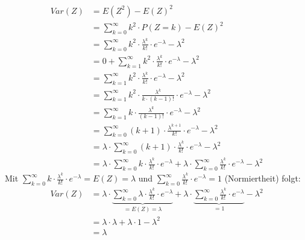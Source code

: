 \begin{equation*}
	\begin{split}
			Var(Z) 	&= E(Z^2) - E(Z)^2 \\
					&= \sum_{k=0}^{\infty} k^2 \cdot P(Z = k) - E(Z)^2\\
					&= \sum_{k=0}^{\infty} k^2 \cdot \frac{\lambda^{k}}{k!} \cdot e^{-\lambda} - \lambda^2\\
					&= 0 + \sum_{k=1}^{\infty} k^2\cdot\frac{\lambda^{k}}{k!}\cdot e^{-\lambda} - \lambda^2\\
					&= \sum_{k=1}^{\infty}k^2\cdot\frac{\lambda^k}{k!}\cdot e^{-\lambda} - \lambda^2\\
					&= \sum_{k=1}^{\infty}k^2\cdot\frac{\lambda^k}{k\cdot (k-1)!}\cdot e^{-\lambda} - \lambda^2\\
					&= \sum_{k=1}^{\infty}k\cdot\frac{\lambda^k}{(k-1)!}\cdot e^{-\lambda} - \lambda^2\\
					&= \sum_{k=0}^{\infty}(k+1)\cdot\frac{\lambda^{k+1}}{k!} \cdot e^{-\lambda} - \lambda^2\\
					&= \lambda \cdot \sum_{k=0}^{\infty} (k+1) \cdot \frac{\lambda^k}{k!} \cdot e^{-\lambda} - \lambda^2\\
					&= \lambda \cdot \sum_{k=0}^{\infty} k \cdot \frac{\lambda^k}{k!}\cdot e^{-\lambda} + \lambda \cdot \sum_{k=0}^{\infty} \frac{\lambda^k}{k!} \cdot e^{-\lambda} - \lambda^2
	\end{split}
\end{equation*}
Mit $\sum_{k=0}^{\infty} k \cdot \frac{\lambda^k}{k!}\cdot e^{-\lambda} = E(Z) = \lambda$ und $\sum_{k=0}^{\infty} \frac{\lambda^k}{k!}\cdot e^{-\lambda} = 1$ (Normiertheit) folgt:
\begin{equation*}
	\begin{split}
		Var(Z) 		&= \lambda \cdot \underbrace{\sum_{k=0}^{\infty}\lambda \cdot \frac{\lambda^k}{k!}\cdot e^{-\lambda}}_{= E(Z) = \lambda} + \lambda \cdot \underbrace{ \sum_{k=0}^{\infty}\frac{\lambda^k}{k!}\cdot e^{-\lambda}}_{= 1} - \lambda^2\\
					&= \lambda \cdot \lambda + \lambda \cdot 1 - \lambda^2\\
					&= \lambda
	\end{split}
\end{equation*}